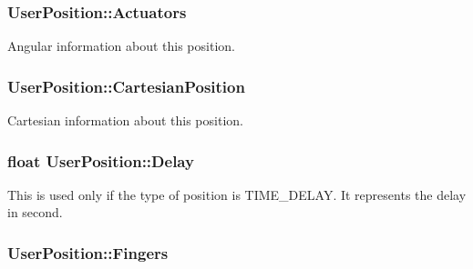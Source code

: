 \subsubsection[{\texorpdfstring{Actuators}{Actuators}}]{ User\+Position\+::\+Actuators}\hypertarget{structUserPosition_ab0c5b71622c1e0d3033572578e947cf3}{}\label{structUserPosition_ab0c5b71622c1e0d3033572578e947cf3}


Angular information about this position. 

\subsubsection[{\texorpdfstring{Cartesian\+Position}{CartesianPosition}}]{ User\+Position\+::\+Cartesian\+Position}\hypertarget{structUserPosition_ab363c40971853637f728978e604c438f}{}\label{structUserPosition_ab363c40971853637f728978e604c438f}


Cartesian information about this position. 

\subsubsection[{\texorpdfstring{Delay}{Delay}}]{\setlength{\rightskip}{0pt plus 5cm}float User\+Position\+::\+Delay}\hypertarget{structUserPosition_aa18896c1238a50c8ad81c66dfd76ac5e}{}\label{structUserPosition_aa18896c1238a50c8ad81c66dfd76ac5e}


This is used only if the type of position is T\+I\+M\+E\+\_\+\+D\+E\+L\+AY. It represents the delay in second. 

\subsubsection[{\texorpdfstring{Fingers}{Fingers}}]{ User\+Position\+::\+Fingers}\hypertarget{structUserPosition_a727907bb6a98b0f3d10aaa8011b67927}{}\label{structUserPosition_a727907bb6a98b0f3d10aaa8011b67927}



